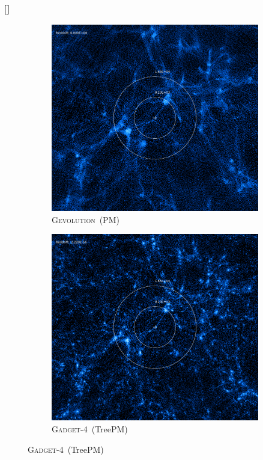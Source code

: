 \documentclass{beamer}
\makeatletter
\newcommand{\mylabel}{%
   [\beamer@againname]}
\newcommand{\gadget}{\textsc{Gadget-4}}
\newcommand{\gevolution}{\textsc{Gevolution}}
\makeatother
\begin{document}

\begin{frame}[label=pmvstreepm]
    \frametitle{\mylabel}
    \begin{figure}
        \begin{subfigure}[b]{.49\textwidth}
        \includegraphics[width=\textwidth]{images/gevolution-z0.png}%
        \caption{\gevolution\ (PM)}
        \end{subfigure}
        \begin{subfigure}[b]{.49\textwidth}
        \includegraphics[width=\textwidth]{images/gadget-z0.png}%
        \caption{\gadget\ (TreePM)}
        \end{subfigure}
    \end{figure}
\end{frame}
\end{document}
